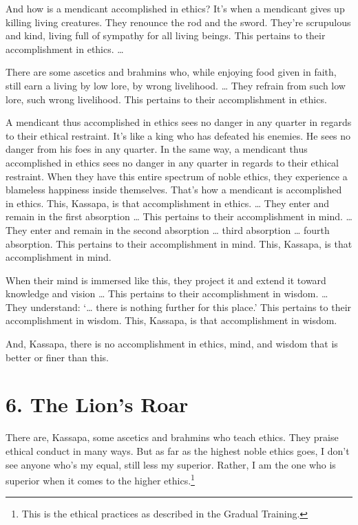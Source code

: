 \documentclass[12pt,openany]{book}%
\begin{document}
And how is a mendicant accomplished in ethics? It’s when a mendicant gives up killing living creatures. They renounce the rod and the sword. They’re scrupulous and kind, living full of sympathy for all living beings. This pertains to their accomplishment in ethics. … 

There are some ascetics and brahmins who, while enjoying food given in faith, still earn a living by low lore, by wrong livelihood. … They refrain from such low lore, such wrong livelihood. This pertains to their accomplishment in ethics. 

A mendicant thus accomplished in ethics sees no danger in any quarter in regards to their ethical restraint. It’s like a king who has defeated his enemies. He sees no danger from his foes in any quarter. In the same way, a mendicant thus accomplished in ethics sees no danger in any quarter in regards to their ethical restraint. When they have this entire spectrum of noble ethics, they experience a blameless happiness inside themselves. That’s how a mendicant is accomplished in ethics. This, Kassapa, is that accomplishment in ethics. … They enter and remain in the first absorption … This pertains to their accomplishment in mind. … They enter and remain in the second absorption … third absorption … fourth absorption. This pertains to their accomplishment in mind. This, Kassapa, is that accomplishment in mind. 

When their mind is immersed like this, they project it and extend it toward knowledge and vision … This pertains to their accomplishment in wisdom. … They understand: ‘… there is nothing further for this place.’ This pertains to their accomplishment in wisdom. This, Kassapa, is that accomplishment in wisdom. 

And, Kassapa, there is no accomplishment in ethics, mind, and wisdom that is better or finer than this. 

\section*{6. The Lion’s Roar }

There are, Kassapa, some ascetics and brahmins who teach ethics. They praise ethical conduct in many ways. But as far as the highest noble ethics goes, I don’t see anyone who’s my equal, still less my superior. Rather, I am the one who is superior when it comes to the higher ethics.\footnote{This is the ethical practices as described in the Gradual Training. } 
\end{document}
